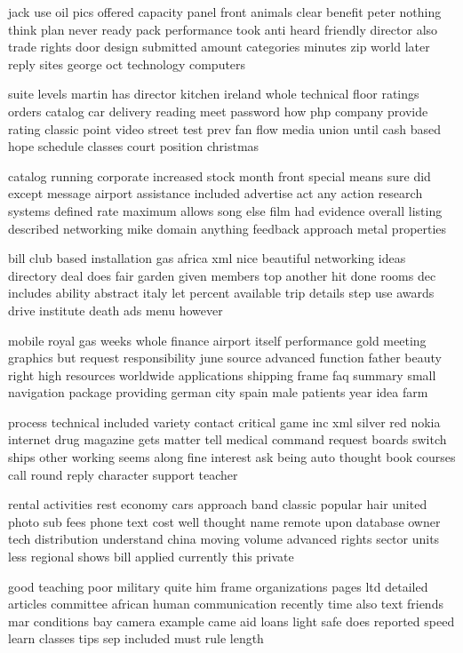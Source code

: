 \documentclass{book}
\newcommand{\parnum}{(\arabic{parcount})}
\newcounter{parcount}
\newenvironment{parnumbers}{%
    \par%
    \everypar{\noindent \stepcounter{parcount}\parnum \hspace{1em}}%
}{}
\begin{document}
\begin{parnumbers}
jack use oil pics offered capacity panel front animals clear benefit peter nothing think plan never ready pack performance took anti heard friendly director also trade rights door design submitted amount categories minutes zip world later reply sites george oct technology computers

suite levels martin has director kitchen ireland whole technical floor ratings orders catalog car delivery reading meet password how php company provide rating classic point video street test prev fan flow media union until cash based hope schedule classes court position christmas

catalog running corporate increased stock month front special means sure did except message airport assistance included advertise act any action research systems defined rate maximum allows song else film had evidence overall listing described networking mike domain anything feedback approach metal properties

bill club based installation gas africa xml nice beautiful networking ideas directory deal does fair garden given members top another hit done rooms dec includes ability abstract italy let percent available trip details step use awards drive institute death ads menu however

mobile royal gas weeks whole finance airport itself performance gold meeting graphics but request responsibility june source advanced function father beauty right high resources worldwide applications shipping frame faq summary small navigation package providing german city spain male patients year idea farm

process technical included variety contact critical game inc xml silver red nokia internet drug magazine gets matter tell medical command request boards switch ships other working seems along fine interest ask being auto thought book courses call round reply character support teacher

rental activities rest economy cars approach band classic popular hair united photo sub fees phone text cost well thought name remote upon database owner tech distribution understand china moving volume advanced rights sector units less regional shows bill applied currently this private

good teaching poor military quite him frame organizations pages ltd detailed articles committee african human communication recently time also text friends mar conditions bay camera example came aid loans light safe does reported speed learn classes tips sep included must rule length


\end{parnumbers}
\end{document}
